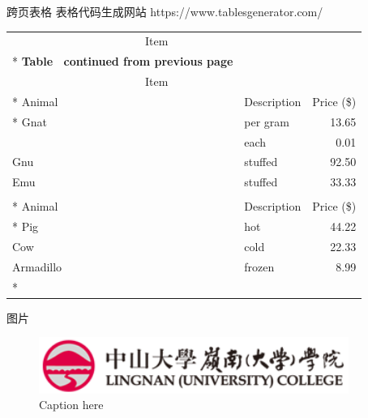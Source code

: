 \documentclass[UTF8,14pt,aspectratio=43,dvipsnames,svgnames,x11names,hyperref={urlcolor=blue}]{beamer}
\begin{document}
\begin{frame}[allowframebreaks]{跨页表格}
	表格代码生成网站 https://www.tablesgenerator.com/
	\begin{longtable}[c]{@{}llr@{}}
		\toprule
		\multicolumn{2}{c}{Item} &            \\* \midrule
		\endfirsthead
		\multicolumn{3}{c}%
		{{\bfseries Table \thetable\ continued from previous page}} \\
		\toprule
		\multicolumn{2}{c}{Item} &            \\* \midrule
		\endhead
		\bottomrule
		\endfoot
		\endlastfoot
		Animal     & Description & Price (\$) \\* \midrule
		Gnat       & per gram    & 13.65      \\
				   & each        & 0.01       \\
		Gnu        & stuffed     & 92.50      \\
		Emu        & stuffed     & 33.33      \\
		\pagebreak  %
		\toprule  %
		\multicolumn{2}{c}{Item} &            \\* \midrule
		Animal     & Description & Price (\$) \\* \midrule
		Pig        & hot         & 44.22      \\
		Cow        & cold        & 22.33      \\
		Armadillo  & frozen      & 8.99       \\* \bottomrule
		\end{longtable}
\end{frame}

\begin{frame}{图片}
	\begin{figure}[tb]
		\centering
		\includegraphics[width=0.9\textwidth]{logo2.png}
		\caption{Caption here\label{fig:figure1}}
	\end{figure}
\end{frame}
\end{document}
